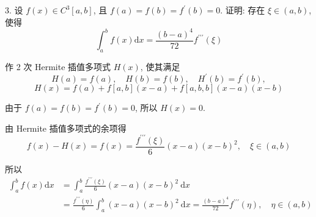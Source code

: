 \begin{tcolorbox}[breakable,enhanced,arc=0mm,outer arc=0mm,
		boxrule=0pt,toprule=1pt,leftrule=0pt,bottomrule=1pt, rightrule=0pt,left=0.2cm,right=0.2cm,
		titlerule=0.5em,toptitle=0.1cm,bottomtitle=-0.1cm,top=0.2cm,
		colframe=white!10!biru,colback=white!90!biru,coltitle=white,
            coltext=black,title =2024-05, title style={white!10!biru}, before skip=8pt, after skip=8pt,before upper=\hspace{2em},
		fonttitle=\bfseries,fontupper=\normalsize]
  
 3. 设 $ f(x) \in C^{3}[a, b] $, 且 $ f(a)=f(b)=f^{\prime}(b)=0 $. 证明: 存在 $ \xi \in(a, b) $, 使得
$$
\int_{a}^{b} f(x) \mathrm{d} x=\frac{(b-a)^{4}}{72} f^{\prime \prime \prime}(\xi)
$$
\tcblower

 作 2 次 Hermite 插值多项式 $ H(x) $, 使其满足
$$
H(a)=f(a), \quad H(b)=f(b), \quad H^{\prime}(b)=f^{\prime}(b),
$$
$$H(x)=f(a)+f[a,b](x-a)+f[a,b,b](x-a)(x-b)$$


由于 $ f(a)=f(b)=f^{\prime}(b)=0 $, 所以 $ H(x)=0 $. 


由 Hermite 插值多项式的余项得
$$
f(x)-H(x)=f(x)=\frac{f^{\prime \prime \prime}(\xi)}{6}(x-a)(x-b)^{2}, \quad \xi \in(a, b)
$$

所以
$$
\begin{aligned}
\int_{a}^{b} f(x) \mathrm{d} x & =\int_{a}^{b} \frac{f^{\prime \prime \prime}(\xi)}{6}(x-a)(x-b)^{2} \mathrm{~d} x\\&=\frac{f^{\prime \prime \prime}(\eta)}{6} \int_{a}^{b}(x-a)(x-b)^{2} \mathrm{~d} x  =\frac{(b-a)^{4}}{72} f^{\prime \prime \prime}(\eta), \quad \eta \in(a, b)
\end{aligned}
$$
  \end{tcolorbox}

